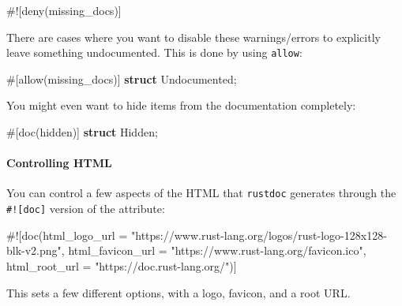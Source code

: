 \documentclass[a4paper,]{book}
\newenvironment{Shaded}{\begin{snugshade}}{\end{snugshade}}
\newcommand{\KeywordTok}[1]{\textcolor[rgb]{0.13,0.29,0.53}{\textbf{{#1}}}}
\newcommand{\StringTok}[1]{\textcolor[rgb]{0.31,0.60,0.02}{{#1}}}
\newcommand{\AttributeTok}[1]{\textcolor[rgb]{0.77,0.63,0.00}{{#1}}}
\newcommand{\NormalTok}[1]{{#1}}
\let\oldparagraph\paragraph
\renewcommand{\paragraph}[1]{\oldparagraph{#1}\mbox{}}
\begin{document}
\begin{Shaded}
\begin{Highlighting}[]
\AttributeTok{#![}\NormalTok{deny}\AttributeTok{(}\NormalTok{missing_docs}\AttributeTok{)]}
\end{Highlighting}
\end{Shaded}

There are cases where you want to disable these warnings/errors to
explicitly leave something undocumented. This is done by using
\texttt{allow}:

\begin{Shaded}
\begin{Highlighting}[]
\AttributeTok{#[}\NormalTok{allow}\AttributeTok{(}\NormalTok{missing_docs}\AttributeTok{)]}
\KeywordTok{struct} \NormalTok{Undocumented;}
\end{Highlighting}
\end{Shaded}

You might even want to hide items from the documentation completely:

\begin{Shaded}
\begin{Highlighting}[]
\AttributeTok{#[}\NormalTok{doc}\AttributeTok{(}\NormalTok{hidden}\AttributeTok{)]}
\KeywordTok{struct} \NormalTok{Hidden;}
\end{Highlighting}
\end{Shaded}

\paragraph{Controlling HTML}\label{controlling-html}

You can control a few aspects of the HTML that \texttt{rustdoc}
generates through the \texttt{\#!{[}doc{]}} version of the attribute:

\begin{Shaded}
\begin{Highlighting}[]
\AttributeTok{#![}\NormalTok{doc}\AttributeTok{(}\NormalTok{html_logo_url }\AttributeTok{=} \StringTok{"https://www.rust-lang.org/logos/rust-logo-128x128-blk-v2.png"}\AttributeTok{,}
       \NormalTok{html_favicon_url }\AttributeTok{=} \StringTok{"https://www.rust-lang.org/favicon.ico"}\AttributeTok{,}
       \NormalTok{html_root_url }\AttributeTok{=} \StringTok{"https://doc.rust-lang.org/"}\AttributeTok{)]}
\end{Highlighting}
\end{Shaded}

This sets a few different options, with a logo, favicon, and a root URL.
\end{document}
